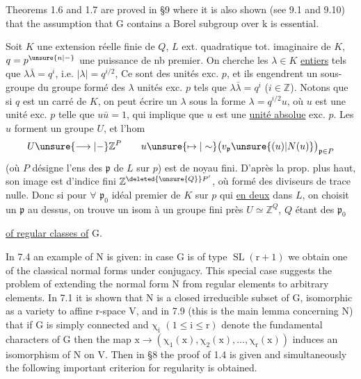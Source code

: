 Theorems 1.6 and 1.7 are proved in \S9 where it is also shown (see 9.1
and 9.10) that the assumption that $\mathrm{G}$ contains a Borel subgroup over $\mathrm{k}$ is
essential.

Soit $K$ une extension   réelle finie de $Q$,
$L$ ext. quadratique tot. imaginaire de $K$,
$q=p^{\unsure{n|-}}$ une puissance de nb premier. On cherche
les $\lambda\in K$ \uline{entiers} tels que $\lambda\bar\lambda=q^i$, i.e.
$|\lambda|=q^{i/2}$,  Ce sont des unités exc. $p$, et
ils engendrent  un sous-groupe du
groupe 
formé des $\lambda$ unités exc. $p$ tels que
$\lambda\bar\lambda=q^i$ ($i\in\mathbb Z$). Notons que  si $q$ est un
carré de $K$, on peut écrire un $\lambda$
sous la forme $\lambda=q^{i/2}u$, où $u$ est une unité
exc. $p$ telle que $u\bar u=1$,  qui implique que
$u$ est une \uline{unité absolue} exc. $p$. Les $u$ forment
un groupe $U$, et l'hom
\[
U\unsure{\longrightarrow|-}\mathbb Z^P
\qquad u\unsure{\mapsto|\sim}\bigl(v_{\mathfrak p}\unsure{(u)|N(u)}\bigr)_{\mathfrak p\in P}
\]
(où $P$ désigne l'ens des $\mathfrak p$ de $L$ sur $p$) est
de noyau fini. D'après la prop. plus haut,
son image est  d'indice fini  $\mathbb Z^{\deleted{\unsure{Q}}P'}$, où
 formé des diviseurs de trace
 nulle. Donc si pour $\forall$ $\mathfrak p_0$  idéal premier de
$K$ sur $p$ qui \uline{ en deux} dans $L$, on choisit
un $\mathfrak p$ au dessus, on trouve un isom à un
groupe fini près $U\simeq\mathbb Z^Q$, $Q$ étant  des $\mathfrak p_0$

\uline{of regular classes of} $\mathrm{G}$.

In 7.4 an example of $\mathrm{N}$ is given: in case $\mathrm{G}$ is of type $\mathrm{\operatorname{SL}(r+1)}$
we obtain one of the classical normal forms under conjugacy. This special
case suggests the problem of extending the normal form $\mathrm{N}$ from regular
elements to arbitrary elements. In 7.1 it is shown that $\mathrm{N}$ is a closed
irreducible subset of $\mathrm{G}$, isomorphic as a variety to affine $\mathrm{r}$-space $\mathrm{V}$,
and in 7.9 (this is the main lemma concerning $\mathrm{N}$) that if $\mathrm{G}$ is simply
connected and $\mathrm{\chi_i}$ $\mathrm{(1\leq i\leq r)}$ denote the fundamental characters of $\mathrm{G}$
then the map $\mathrm{x\to(\chi_1(x),\chi_2(x),\ldots,\chi_r(x))}$ induces an isomorphism of $\mathrm{N}$
on $\mathrm{V}$. Then in \S8 the proof of 1.4 is given and simultaneously the following
important criterion for regularity is obtained.

